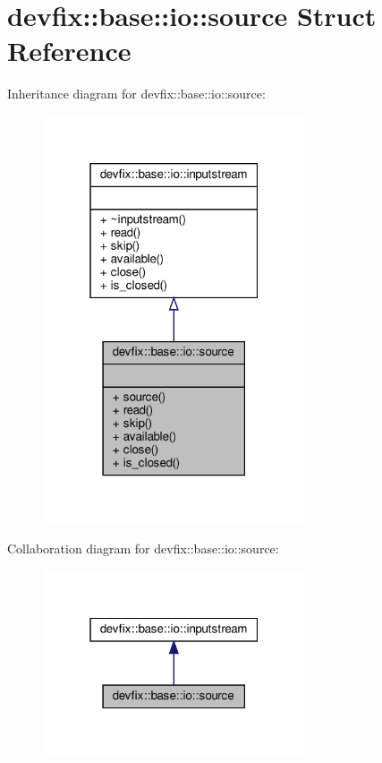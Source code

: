 \hypertarget{structdevfix_1_1base_1_1io_1_1source}{}\section{devfix\+:\+:base\+:\+:io\+:\+:source Struct Reference}
\label{structdevfix_1_1base_1_1io_1_1source}


Inheritance diagram for devfix\+:\+:base\+:\+:io\+:\+:source\+:\nopagebreak
\begin{figure}[H]
\begin{center}
\leavevmode
\includegraphics[width=220pt]{structdevfix_1_1base_1_1io_1_1source__inherit__graph}
\end{center}
\end{figure}


Collaboration diagram for devfix\+:\+:base\+:\+:io\+:\+:source\+:
\nopagebreak
\begin{figure}[H]
\begin{center}
\leavevmode
\includegraphics[width=220pt]{structdevfix_1_1base_1_1io_1_1source__coll__graph}
\end{center}
\end{figure}
